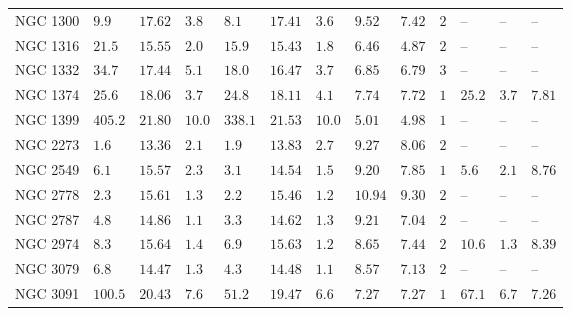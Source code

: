 \begin{table*}
\begin{center}
\begin{tabular}{lllllllllllll}
NGC 1300  \quad &  $9.9$  &  $17.62$  &  $3.8$  \quad \quad &  $8.1$  &  $17.41$  &  $3.6$  &  $9.52$  &  $7.42$  \quad \quad &  $2$  \quad \quad &   -- &   -- &   --    \\ 
NGC 1316  \quad &  $21.5$  &  $15.55$  &  $2.0$  \quad \quad &  $15.9$  &  $15.43$  &  $1.8$  &  $6.46$  &  $4.87$  \quad \quad &  $2$  \quad \quad &   -- &   -- &   --    \\ 
NGC 1332  \quad &  $34.7$  &  $17.44$  &  $5.1$  \quad \quad &  $18.0$  &  $16.47$  &  $3.7$  &  $6.85$  &  $6.79$  \quad \quad &  $3$  \quad \quad &   -- &   -- &   --    \\ 
NGC 1374  \quad &  $25.6$  &  $18.06$  &  $3.7$  \quad \quad &  $24.8$  &  $18.11$  &  $4.1$  &  $7.74$  &  $7.72$  \quad \quad &  $1$  \quad \quad &  $25.2$  &  $3.7$  &  $7.81$  \\ 
NGC 1399  \quad &  $405.2$  &  $21.80$  &  $10.0$  \quad \quad &  $338.1$  &  $21.53$  &  $10.0$  &  $5.01$  &  $4.98$  \quad \quad &  $1$  \quad \quad &   -- &   -- &   --    \\ 
NGC 2273  \quad &  $1.6$  &  $13.36$  &  $2.1$  \quad \quad &  $1.9$  &  $13.83$  &  $2.7$  &  $9.27$  &  $8.06$  \quad \quad &  $2$  \quad \quad &   -- &   -- &   --    \\ 
NGC 2549  \quad &  $6.1$  &  $15.57$  &  $2.3$  \quad \quad &  $3.1$  &  $14.54$  &  $1.5$  &  $9.20$  &  $7.85$  \quad \quad &  $1$  \quad \quad &  $5.6$  &  $2.1$  &  $8.76$  \\ 
NGC 2778  \quad &  $2.3$  &  $15.61$  &  $1.3$  \quad \quad &  $2.2$  &  $15.46$  &  $1.2$  &  $10.94$  &  $9.30$  \quad \quad &  $2$  \quad \quad &   -- &   -- &   --    \\ 
NGC 2787  \quad &  $4.8$  &  $14.86$  &  $1.1$  \quad \quad &  $3.3$  &  $14.62$  &  $1.3$  &  $9.21$  &  $7.04$  \quad \quad &  $2$  \quad \quad &   -- &   -- &   --    \\ 
NGC 2974  \quad &  $8.3$  &  $15.64$  &  $1.4$  \quad \quad &  $6.9$  &  $15.63$  &  $1.2$  &  $8.65$  &  $7.44$  \quad \quad &  $2$  \quad \quad &  $10.6$  &  $1.3$  &  $8.39$  \\ 
NGC 3079  \quad &  $6.8$  &  $14.47$  &  $1.3$  \quad \quad &  $4.3$  &  $14.48$  &  $1.1$  &  $8.57$  &  $7.13$  \quad \quad &  $2$  \quad \quad &   -- &   -- &   --    \\ 
NGC 3091  \quad &  $100.5$  &  $20.43$  &  $7.6$  \quad \quad &  $51.2$  &  $19.47$  &  $6.6$  &  $7.27$  &  $7.27$  \quad \quad &  $1$  \quad \quad &  $67.1$  &  $6.7$  &  $7.26$  \\ 

\end{tabular}
\end{center}
\end{table*}
